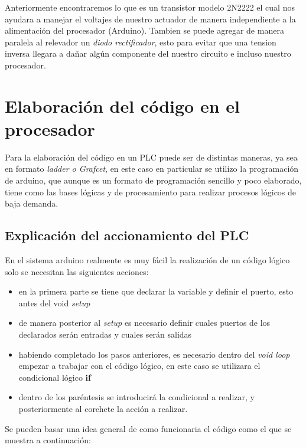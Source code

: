 \documentclass[11pt,a4paper]{article}
\begin{document}
Anteriormente encontraremos lo que es un transistor modelo 2N2222 el cual nos ayudara a manejar el voltajes de nuestro actuador de manera independiente a la alimentación del procesador (Arduino). Tambien se puede agregar de manera paralela al relevador un \emph{diodo rectificador}, esto para evitar que una tension inversa llegara a dañar algún componente del nuestro circuito e incluso nuestro procesador.

\section{Elaboración del código en el procesador}
Para la elaboración del código en un PLC puede ser de distintas maneras, ya sea en formato \emph{ladder o Grafcet}, en este caso en particular se utilizo la programación de arduino, que aunque es un formato de programación sencillo y poco elaborado, tiene como las bases lógicas y de procesamiento para realizar procesos lógicos de baja demanda.

\subsection{Explicación del accionamiento del PLC}
En el sistema arduino realmente es muy fácil la realización de un código lógico solo se necesitan las siguientes acciones:
\begin{itemize}
\item en la primera parte se tiene que declarar la variable y definir el puerto, esto antes del void \emph{setup}
\item de manera posterior al \emph{setup} es necesario definir cuales puertos de los declarados serán entradas y cuales serán salidas
\item habiendo completado los pasos anteriores, es necesario dentro del \emph{void loop} empezar a trabajar con el código lógico, en este caso se utilizara el condicional lógico \textbf{if} 
\item dentro de los paréntesis se introducirá la condicional a realizar, y posteriormente al corchete la acción a realizar.

\end{itemize}

Se pueden basar una idea general de como funcionaria el código como el que se muestra a continuación:
\end{document}
